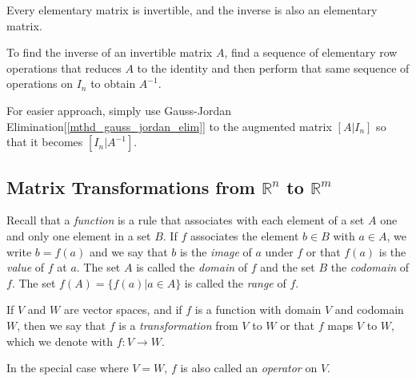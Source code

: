 \documentclass{report}
\begin{document}
		\begin{thm}\label{thm_elementary_invertible}
			Every elementary matrix is invertible, and the inverse is also an elementary matrix.
		\end{thm}
		
		\begin{mthd}
			To find the inverse of an invertible matrix $A$, find a sequence of elementary row operations that reduces $A$ to the identity and then perform that same sequence of operations on $I_n$ to obtain $A^{-1}$.
			
			For easier approach, simply use Gauss-Jordan Elimination[\ref{mthd_gauss_jordan_elim}] to the augmented matrix $\left[A|I_n\right]$ so that it becomes $\left[I_n|A^{-1}\right]$.
		\end{mthd}
		
	\subsection{Matrix Transformations from $\mathbb{R}^n$ to $\mathbb{R}^m$}
	
		Recall that a \emph{function} is a rule that associates with each element of a set $A$ one and only one element in a set $B$. If $f$ associates the element $b \in B$ with $a \in A$, we write $b=f(a)$ and we say that $b$ is the \emph{image} of $a$ under $f$ or that $f(a)$ is the \emph{value} of $f$ at $a$. The set $A$ is called the \emph{domain} of $f$ and the set $B$ the \emph{codomain} of $f$. The set $f(A)=\{f(a)|a \in A\}$ is called the \emph{range} of $f$.
		
		\begin{defn}[Transformation]
			If $V$ and $W$ are vector spaces, and if $f$ is a function with domain $V$ and codomain $W$, then we say that $f$ is a \emph{transformation} from $V$ to $W$ or that $f$ maps $V$ to $W$, which we denote with $f:V \rightarrow W$.
			
			In the special case where $V=W$, $f$ is also called an \emph{operator} on $V$.
		\end{defn}
		
\end{document}
